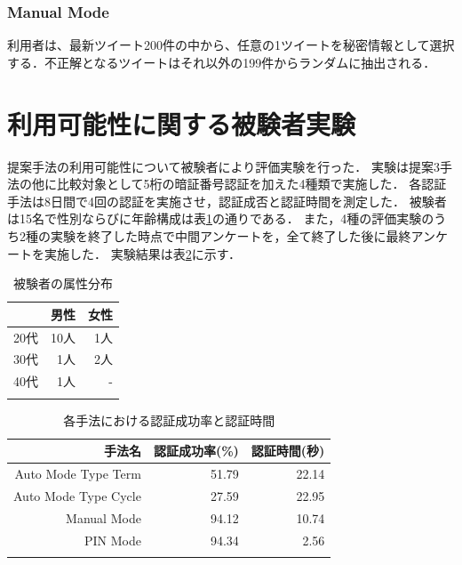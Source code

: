 \documentclass[twocolumn, a4paper, 9pt]{UECIEresume}
\newcommand{\bhline}{\noalign{\hrule height 1pt}}
\begin{document}
\subsubsection{Manual Mode}
利用者は、最新ツイート200件の中から、任意の1ツイートを秘密情報として選択する．不正解となるツイートはそれ以外の199件からランダムに抽出される．

\section{利用可能性に関する被験者実験}\label{result}
提案手法の利用可能性について被験者により評価実験を行った．
実験は提案3手法の他に比較対象として5桁の暗証番号認証を加えた4種類で実施した．
各認証手法は8日間で4回の認証を実施させ，認証成否と認証時間を測定した．
被験者は15名で性別ならびに年齢構成は表\ref{testee}の通りである．
また，4種の評価実験のうち2種の実験を終了した時点で中間アンケートを，全て終了した後に最終アンケートを実施した．
実験結果は表\ref{eachResult}に示す．

\begin{table}[ht]
  \caption{被験者の属性分布}
  \label{testee}
  \begin{center}
    \small
    \begin{tabular}{rrr}
      \bhline
       & 男性 & 女性 \\ \hline
      20代 & 10人 & 1人 \\
      30代 & 1人 & 2人 \\
      40代 & 1人 & - \\
      \bhline
    \end{tabular}
  \end{center}
\end{table}

\begin{table}[ht]
  \caption{各手法における認証成功率と認証時間}
  \label{eachResult}
  \begin{center}
    \small
    \begin{tabular}{rrr}
      \bhline
      手法名 & 認証成功率(\%) & 認証時間(秒) \\ \hline
      Auto Mode Type Term & 51.79 & 22.14 \\
      Auto Mode Type Cycle & 27.59 & 22.95 \\
      Manual Mode & 94.12 & 10.74 \\
      PIN Mode & 94.34 & 2.56 \\
      \bhline
    \end{tabular}
  \end{center}
\end{table}
\end{document}
